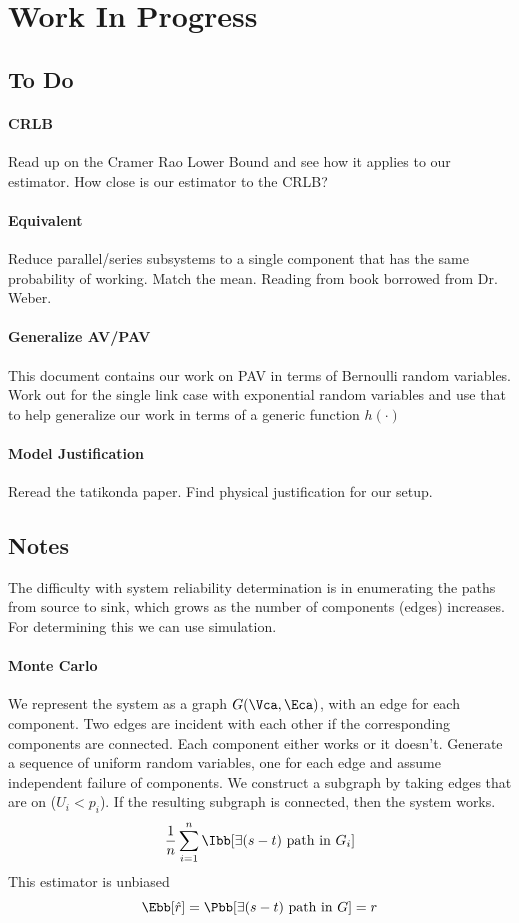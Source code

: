 \documentclass[11pt]{article}
\begin{document}
\setcounter{section}{-1}
\section{Work In Progress}
\subsection{To Do}
\paragraph{CRLB}
Read up on the Cramer Rao Lower Bound and see how it applies to our estimator. How close is our estimator to the CRLB?

\paragraph{Equivalent}
Reduce parallel/series subsystems to a single component that has the same probability of working. Match the mean. Reading from book borrowed from Dr. Weber.

\paragraph{Generalize AV/PAV}
This document contains our work on PAV in terms of Bernoulli random variables. Work out for the single link case with exponential random variables and use that to help generalize our work in terms of a generic function $h(\cdot)$

\paragraph{Model Justification}
Reread the tatikonda paper. Find physical justification for our setup.

\subsection{Notes}
The difficulty with system reliability determination is in enumerating the paths from source to sink, which grows as the number of components (edges) increases. For determining this we can use simulation.

\paragraph{Monte Carlo}
We represent the system as a graph $G(\Vca,\Eca)$, with an edge for each component. Two edges are incident with each other if the corresponding components are connected. Each component either works or it doesn't. Generate a sequence of uniform random variables, one for each edge and assume independent failure of components. We construct a subgraph by taking edges that are on ($U_i < p_i$). If the resulting subgraph is connected, then the system works.
\[
\frac{1}{n}\displaystyle\sum_{i=1}^{n}\Ibb[\exists (s-t)~\mbox{path in}~G_i]
\]
This estimator is unbiased
\[
\Ebb[\hat{r}]=\Pbb[\exists (s-t)~\mbox{path in}~G]=r
\]
\end{document}
